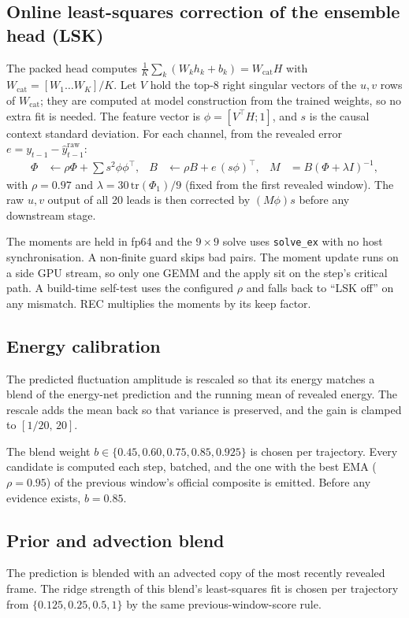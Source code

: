 \documentclass[10pt]{article}
\newcommand{\cfg}[1]{\texttt{#1}}
\begin{document}
\subsection{Online least-squares correction of the ensemble head (LSK)}\label{sec:lsk}
The packed head computes $\frac1K\sum_k (W_kh_k+b_k)=W_{\text{cat}}H$ with
$W_{\text{cat}}=[W_1\dots W_K]/K$. Let $V$ hold the top-8 right singular vectors of the $u,v$ rows of
$W_{\text{cat}}$; they are computed at model construction from the trained weights, so no extra fit is needed.
The feature vector is $\phi=[V^\top H;1]$, and $s$ is the causal context standard deviation. For each channel,
from the revealed error $e=y_{t-1}-\hat y^{\text{raw}}_{t-1}$:
\begin{align}
  \Phi&\leftarrow\rho\Phi+\textstyle\sum s^2\phi\phi^\top, &
  B&\leftarrow\rho B+e\,(s\phi)^\top, &
  M&=B(\Phi+\lambda I)^{-1},
\end{align}
with $\rho=0.97$ and $\lambda=30\,\mathrm{tr}(\Phi_1)/9$ (fixed from the first revealed window). The raw $u,v$
output of all 20 leads is then corrected by $(M\phi)s$ before any downstream stage.

The moments are held in fp64 and the $9\times9$ solve uses \cfg{solve\_ex} with no host synchronisation. A
non-finite guard skips bad pairs. The moment update runs on a side GPU stream, so only one GEMM and the apply
sit on the step's critical path. A build-time self-test uses the configured $\rho$ and falls back to ``LSK off''
on any mismatch. REC multiplies the moments by its keep factor.

\subsection{Energy calibration}
The predicted fluctuation amplitude is rescaled so that its energy matches a blend of the energy-net prediction
and the running mean of revealed energy. The rescale adds the mean back so that variance is preserved, and the
gain is clamped to $[1/20,\,20]$.

The blend weight $b\in\{0.45,0.60,0.75,0.85,0.925\}$ is chosen per trajectory. Every candidate is computed each
step, batched, and the one with the best EMA ($\rho=0.95$) of the previous window's official composite is
emitted. Before any evidence exists, $b=0.85$.

\subsection{Prior and advection blend}
The prediction is blended with an advected copy of the most recently revealed frame. The ridge strength of this
blend's least-squares fit is chosen per trajectory from $\{0.125,0.25,0.5,1\}$ by the same previous-window-score
rule.
\end{document}
